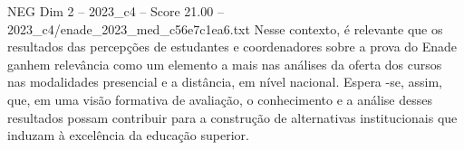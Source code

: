 \begin{textsample}{NEG Dim 2 – 2023\_c4 – Score 21.00 – 2023\_c4/enade\_2023\_med\_c56e7c1ea6.txt}
Nesse contexto, é relevante que os resultados das percepções de estudantes e coordenadores sobre a prova do Enade ganhem relevância como um elemento a mais nas análises da oferta dos cursos nas modalidades presencial e a distância, em nível nacional.
Espera -se, assim, que, em uma visão formativa de avaliação, o conhecimento e a análise desses resultados possam contribuir para a construção de alternativas institucionais que induzam à excelência da educação superior.

\end{textsample}
